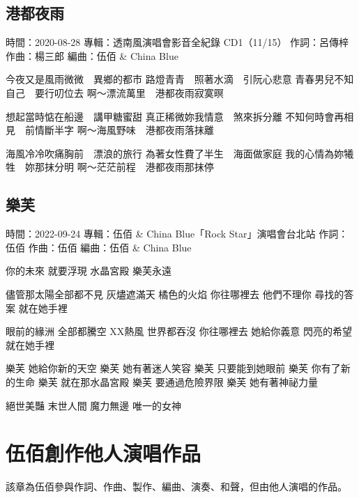 \documentclass[UTF8,a4paper,oneside,twocolumn,12pt]{ctexbook}
\newcommand{\infopair}[2]{\textbullet #1：#2}
\newcommand{\zc}[1][伍佰]{\infopair{作詞}{#1}}
\newcommand{\zq}[1][伍佰]{\infopair{作曲}{#1}}
\newcommand{\bq}[1][伍佰]{\infopair{編曲}{#1}}
\newcommand{\zj}[1]{\infopair{專輯}{#1}}
\newcommand{\sj}[1]{\infopair{時間}{#1}}
\newenvironment{info}{\begin{flushleft}\kaishu
	}
	{\end{flushleft}\normalsize\yahei\par}
\newenvironment{lyric}{
	}
{}
\begin{document}
\section{港都夜雨}
\begin{info}
	\sj{2020-08-28}
	\zj{透南風演唱會影音全紀錄 CD1（11/15）}
	\zc[呂傳梓]
	\zq[楊三郎]
	\bq[伍佰 \& China Blue]
\end{info}
\begin{lyric}
	今夜又是風雨微微　異鄉的都市
	路燈青青　照著水滴　引阮心悲意
	青春男兒不知自己　要行叨位去
	啊～漂流萬里　港都夜雨寂寞暝

	想起當時惦在船邊　講甲糖蜜甜
	真正稀微妳我情意　煞來拆分離
	不知何時會再相見　前情斷半字
	啊～海風野味　港都夜雨落抹離

	海風冷冷吹痛胸前　漂浪的旅行
	為著女性費了半生　海面做家庭
	我的心情為妳犧牲　妳那抹分明
	啊～茫茫前程　港都夜雨那抹停
\end{lyric}

\section{樂芙}%
\begin{info}
	\sj{2022-09-24}
	\zj{伍佰 \& China Blue「Rock Star」演唱會台北站}
	\zc
	\zq
	\bq[伍佰 \& China Blue]
\end{info}
\begin{lyric}%
	你的未來 就要浮現 水晶宮殿 樂芙永遠

	儘管那太陽全部都不見 灰燼遮滿天 橘色的火焰
	你往哪裡去 他們不理你 尋找的答案 就在她手裡

	眼前的緣洲 全部都騰空 XX熱風 世界都吞沒
	你往哪裡去 她給你義意 閃亮的希望 就在她手裡

	樂芙 她給你新的天空 樂芙 她有著迷人笑容
	樂芙 只要能到她眼前 樂芙 你有了新的生命
	樂芙 就在那水晶宮殿 樂芙 要通過危險界限
	樂芙 她有著神祕力量

	絕世美豔 末世人間 魔力無邊 唯一的女神
\end{lyric}

\chapter{伍佰創作他人演唱作品}
該章為伍佰參與作詞、作曲、製作、編曲、演奏、和聲，但由他人演唱的作品。
\end{document}
